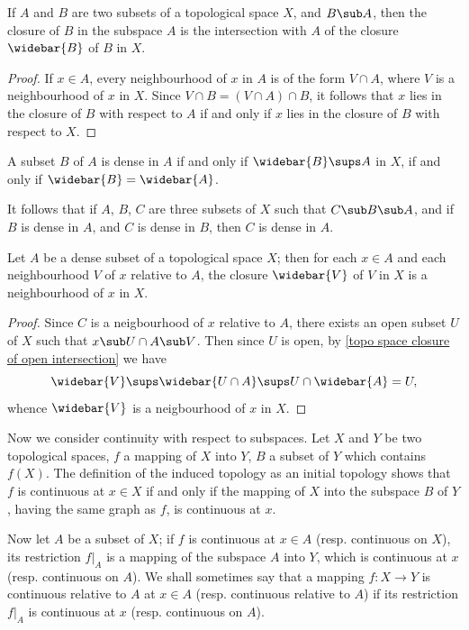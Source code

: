\begin{proposition}\label{topological subspace closure char}
If $A$ and $B$ are two subsets of a topological space $X$, and $B\sub A$, then the closure of $B$ in the subspace $A$ is the intersection with $A$ of the closure $\widebar{B}$ of $B$ in $X$.
\end{proposition}
\begin{proof}
If $x\in A$, every neighbourhood of $x$ in $A$ is of the form $V\cap A$, where $V$ is a neighbourhood of $x$ in $X$. Since $V\cap B=(V\cap A)\cap B$, it follows that $x$ lies in the closure of $B$ with respect to $A$ if and only if $x$ lies in the closure of $B$ with respect to $X$.
\end{proof}
\begin{corollary}
A subset $B$ of $A$ is dense in $A$ if and only if $\widebar{B}\sups A$ in $X$, if and only if $\widebar{B}=\widebar{A}$.
\end{corollary}
\begin{corollary}\label{topo space transitivity of density}
It follows that if $A$, $B$, $C$ are three subsets of $X$ such that $C\sub B\sub A$, and if $B$ is dense in $A$, and $C$ is dense in $B$, then $C$ is dense in $A$.
\end{corollary}
\begin{proposition}\label{topological dense subspace closure of nbhd}
Let $A$ be a dense subset of a topological space $X$; then for each $x\in A$ and each neighbourhood $V$ of $x$ relative to $A$, the closure $\widebar{V}$ of $V$ in $X$ is a neighbourhood of $x$ in $X$.
\end{proposition}
\begin{proof}
Since $C$ is a neigbourhood of $x$ relative to $A$, there exists an open subset $U$ of $X$ such that $x\sub U\cap A\sub V$. Then since $U$ is open, by \cref{topo space closure of open intersection} we have
\[\widebar{V}\sups\widebar{U\cap A}\sups U\cap\widebar{A}=U,\]
whence $\widebar{V}$ is a neigbourhood of $x$ in $X$.
\end{proof}
Now we consider continuity with respect to subspaces. Let $X$ and $Y$ be two topological spaces, $f$ a mapping of $X$ into $Y$, $B$ a subset of $Y$ which contains $f(X)$. The definition of the induced topology as an initial topology shows that $f$ is continuous at $x\in X$ if and only if the mapping of $X$ into the subspace $B$ of $Y$, having the same graph as $f$, is continuous at $x$.\par
Now let $A$ be a subset of $X$; if $f$ is continuous at $x\in A$ (resp. continuous on $X$), its restriction $f|_A$ is a mapping of the subspace $A$ into $Y$, which is continuous at $x$ (resp. continuous on $A$). We shall sometimes say that a mapping $f:X\to Y$ is continuous relative to $A$ at $x\in A$ (resp. continuous relative to $A$) if its restriction $f|_A$ is continuous at $x$ (resp. continuous on $A$).\par
